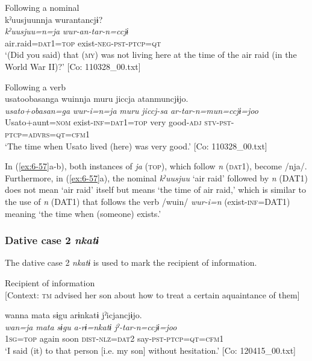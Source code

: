 \ea\label{ex:6-57}
\ea Following a nominal\\
{\US}
\glll kˀuusjuunnja  wurantancjɨ?\\
 \textit{kˀuusjuu=n=ja}  \textit{wur-an-tar-n=ccjɨ}\\
      air.raid=\textsc{dat}1=\textsc{top}  exist-\textsc{neg}-\textsc{pst}-\textsc{ptcp}=\textsc{qt}\\
\glt ‘(Did you said) that (\textsc{my}) was not living here at the time of the air raid (in the World War II)?’ [Co: 110328\_00.txt]
\z

\ex Following a verb\\
{\TM}
\glll  usato{\textbar}obasan{\textbar}ga  wuinnja  muru  jiccja atanmuncjɨjo.\\
\textit{usato+obasan=ga}  \textit{wur-i=n=ja}  \textit{muru}  \textit{jiccj-sa} \textit{ar-tar-n=mun=ccjɨ=joo}\\
Usato+aunt=\textsc{nom}  exist-\textsc{inf}=\textsc{dat}1=\textsc{top}  very  good-\textsc{adj}  \textsc{stv}-\textsc{pst}-\textsc{ptcp}=\textsc{advrs}=\textsc{qt}=\textsc{cfm}1\\
\glt ‘The time when Usato lived (here) was very good.’ [Co: 110328\_00.txt]
\z

In (\ref{ex:6-57}a-b), both instances of \textit{ja} (\textsc{top}), which follow \textit{n} (\textsc{dat}1), become /nja/. Furthermore, in (\ref{ex:6-57}a), the nominal \textit{kˀuusjuu} ‘air raid’ followed by \textit{n} (DAT1) does not mean ‘air raid’ itself but means ‘the time of air raid,’ which is similar to the use of \textit{n} (DAT1) that follows the verb /wuin/ \textit{wur-i=n} (exist-\textsc{inf}=DAT1) meaning ‘the time when (someone) exists.’

\subsubsection{Dative case 2 \textit{nkatɨ}}

The dative case 2 \textit{nkatɨ} is used to mark the recipient of information.

\ea\label{ex:6-58}
 Recipient of information\\{}
[Context: \textsc{tm} advised her son about how to treat a certain aquaintance of them]

{\TM}
\glll wanna  mata  sɨgu  arɨnkatɨ  jˀicjancjɨjo.\\
\textit{wan=ja}  \textit{mata}  \textit{sɨgu}  \textit{a-rɨ=nkatɨ}  \textit{jˀ-tar-n=ccjɨ=joo}\\
    1\textsc{sg}=\textsc{top}  again  soon  \textsc{dist}-\textsc{nlz}=\textsc{dat}2  say-\textsc{pst}-\textsc{ptcp}=\textsc{qt}=\textsc{cfm}1\\
\glt    ‘I said (it) to that person [i.e. my son] without hesitation.’ [Co: 120415\_00.txt]
\z

